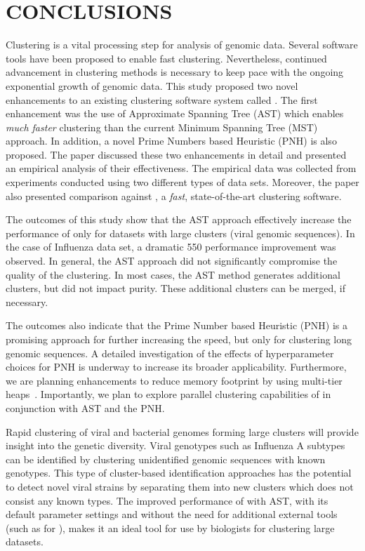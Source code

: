 \section{CONCLUSIONS}

Clustering is a vital processing step for analysis of genomic data.
Several software tools have been proposed to enable fast clustering.
Nevertheless, continued advancement in clustering methods is necessary
to keep pace with the ongoing exponential growth of genomic data.
This study proposed two novel enhancements to an existing clustering
software system called \peace.  The first enhancement was the use of
Approximate Spanning Tree (AST) which enables \emph{much faster}
clustering than the current Minimum Spanning Tree (MST) approach.  In
addition, a novel Prime Numbers based Heuristic (PNH) is also
proposed.  The paper discussed these two enhancements in detail and
presented an empirical analysis of their effectiveness.  The empirical
data was collected from experiments conducted using two different
types of data sets.  Moreover, the paper also presented comparison
against , a \emph{fast}, state-of-the-art clustering
software.

The outcomes of this study show that the AST approach effectively
increase the performance of \peace\/ only for datasets with large
clusters (viral genomic sequences).  In the case of Influenza data
set, a dramatic 550\texttimes\/ performance improvement was observed.
In general, the AST approach did not significantly compromise the
quality of the clustering.  In most cases, the AST method generates
additional clusters, but did not impact purity.  These additional
clusters can be merged, if necessary.

The outcomes also indicate that the Prime Number based Heuristic (PNH)
is a promising approach for further increasing the speed, but only for
clustering long genomic sequences.  A detailed investigation of the
effects of hyperparameter choices for PNH is underway to increase its
broader applicability.  Furthermore, we are planning enhancements to
reduce memory footprint by using multi-tier heaps~\cite{higiro-17}.
Importantly, we plan to explore parallel clustering capabilities of
\peace\/ in conjunction with AST and the PNH.

Rapid clustering of viral and bacterial genomes forming large clusters
will provide insight into the genetic diversity. Viral genotypes such
as Influenza A subtypes can be identified by clustering unidentified
genomic sequences with known genotypes. This type of cluster-based
identification approaches has the potential to detect novel viral
strains by separating them into new clusters which does not consist
any known types.  The improved performance of \peace\/ with AST, with
its default parameter settings and without the need for additional
external tools (such as  for ), makes it an ideal tool
for use by biologists for clustering large datasets.

\newpage
